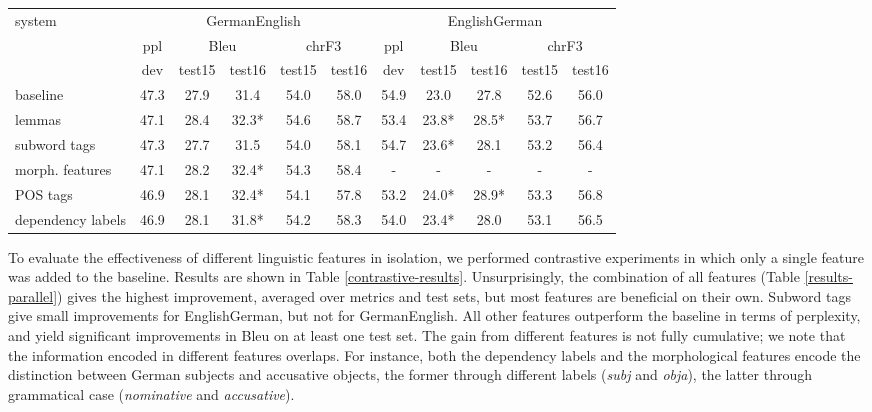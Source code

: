 \documentclass[11pt]{article}
\begin{document}
\begin{table*}
\centering
\small
\begin{tabular}{l|c|cc|cc||c|cc|cc}
\multirow{3}{*}{system} & \multicolumn{5}{c||}{GermanEnglish} & \multicolumn{5}{c}{EnglishGerman}\\
& ppl  & \multicolumn{2}{c|}{{\sc Bleu} } & \multicolumn{2}{c||}{{\sc chrF3} } & ppl  & \multicolumn{2}{c|}{{\sc Bleu} } & \multicolumn{2}{c}{{\sc chrF3} }\\
& dev & test15 & test16  & test15 & test16 & dev & test15 & test16  & test15 & test16\\
\hline
baseline & 47.3 & 27.9\phantom{*} & 31.4\phantom{*} & 54.0 & 58.0 & 54.9 & 23.0\phantom{*} & 27.8\phantom{*} & 52.6 & 56.0 \\ lemmas & 47.1 & 28.4\phantom{*} & 32.3* & 54.6 & 58.7 & 53.4 & 23.8* & 28.5* & 53.7 & 56.7 \\ subword tags & 47.3 & 27.7\phantom{*} & 31.5\phantom{*} & 54.0 & 58.1 & 54.7 & 23.6* & 28.1\phantom{*} & 53.2 & 56.4\\ morph. features & 47.1 & 28.2\phantom{*} & 32.4* & 54.3 & 58.4 & - & - & - & - & - \\
POS tags & 46.9 & 28.1\phantom{*} & 32.4* & 54.1 & 57.8 & 53.2 & 24.0* & 28.9*  & 53.3 & 56.8 \\ dependency labels & 46.9 & 28.1\phantom{*} & 31.8* & 54.2 & 58.3 & 54.0 & 23.4*  & 28.0\phantom{*} & 53.1 & 56.5 \\ \end{tabular}
\caption{Contrastive experiments with individual linguistic features: best perplexity on dev (newstest2013), and {\sc Bleu} and {\sc chrF3} on test15 (newstest2015) and test16 (newstest2016). {\sc Bleu} scores that are significantly different (p < 0.05) from respective baseline are marked with (*).}
\label{contrastive-results}
\end{table*}


To evaluate the effectiveness of different linguistic features in isolation, we performed contrastive experiments in which only a single feature was added to the baseline.
Results are shown in Table \ref{contrastive-results}.
Unsurprisingly, the combination of all features (Table \ref{results-parallel}) gives the highest improvement, averaged over metrics and test sets, but most features are beneficial on their own.
Subword tags give small improvements for EnglishGerman, but not for GermanEnglish.
All other features outperform the baseline in terms of perplexity, and yield significant improvements in {\sc Bleu} on at least one test set.
The gain from different features is not fully cumulative; we note that the information encoded in different features overlaps.
For instance, both the dependency labels and the morphological features encode the distinction between German subjects and accusative objects, the former through different labels (\emph{subj} and \emph{obja}), the latter through grammatical case (\emph{nominative} and \emph{accusative}).
\end{document}
